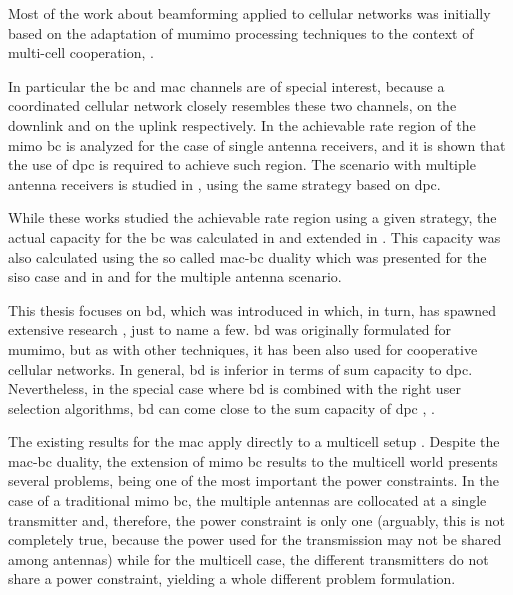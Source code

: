 Most of the work about beamforming applied to cellular networks was initially
based on the adaptation of \gls{mumimo} processing techniques to the context of
multi-cell cooperation, \cite{gesbert10}.

In particular the \gls{bc} and \gls{mac} channels are of special interest,
because a coordinated cellular network closely resembles these two channels, on
the downlink and on the uplink respectively. In \cite{caire00} the achievable
rate region of the \gls{mimo} \gls{bc} is analyzed for the case of single
antenna receivers, and it is shown that the use of \gls{dpc} is required to
achieve such region. The scenario with multiple antenna receivers is studied in
\cite{yu01}, using the same strategy based on \gls{dpc}.

While these works studied the achievable rate region using a given strategy,
the actual capacity for the \gls{bc} was calculated in \cite{yu04} and extended 
in \cite{weingarten06}. This capacity was also calculated using the so called
\gls{mac}-\gls{bc} duality which was presented \cite{jindal01} for the
\gls{siso} case and in \cite{vishwanath02} and \cite{jindal04} for the multiple
antenna scenario.

This thesis focuses on \gls{bd}, which was introduced in \cite{spencer04}
which, in turn, has spawned extensive research \cite{spencer04b, yoo06,
gesbert07b, shen06, wiesel08, stankovic08}, just to name a few. \gls{bd} was
originally formulated for \gls{mumimo}, but as with other techniques, it has
been also used for cooperative cellular networks. In general, \gls{bd} is
inferior in terms of sum capacity to \gls{dpc}. Nevertheless, in the special
case where \gls{bd} is combined with the right user selection algorithms,
\gls{bd} can come close to the sum capacity of \gls{dpc} \cite{shen06},
\cite{yoo06}.

The existing results for the \gls{mac} apply directly to a multicell setup
\cite{jafar04}. Despite the \gls{mac}-\gls{bc} duality, the extension of
\gls{mimo} \gls{bc} results to the multicell world presents several problems,
being one of the most important the power constraints. In the case of a
traditional \gls{mimo} \gls{bc}, the multiple antennas are collocated at a
single transmitter and, therefore, the power constraint is only one (arguably,
this is not completely true, because the power used for the transmission may not
be shared among antennas) while for the multicell case, the different
transmitters do not share a power constraint, yielding a whole different problem
formulation.

